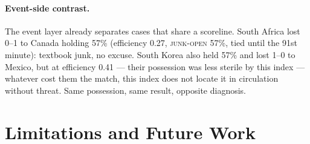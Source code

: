 \documentclass[11pt]{article}
\newcommand{\junk}{\textsc{junk-open}}
\begin{document}
\paragraph{Event-side contrast.} The event layer already separates cases that
share a scoreline. South Africa lost 0--1 to Canada holding 57\% (efficiency
0.27, \junk{} 57\%, tied until the 91st minute): textbook junk, no excuse.
South Korea also held 57\% and lost 1--0 to Mexico, but at efficiency 0.41 ---
their possession was less sterile by this index --- whatever cost them the
match, this index does not locate it in circulation without threat. Same
possession, same result, opposite diagnosis.

\section{Limitations and Future Work}
\label{sec:limitations}
\end{document}
